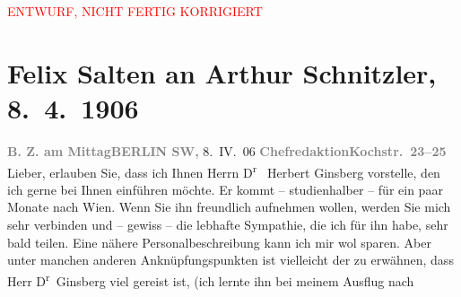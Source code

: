 
\begin{center}
            \textcolor{red}{ENTWURF, NICHT FERTIG KORRIGIERT}
                      \end{center}
            
         
         \renewcommand{\erwaehntePersonen}{Personen: Herbert Ginsberg, Ottilie Salten, Olga Schnitzler}
         \renewcommand{\erwaehnteInstitutionen}{Institutionen: B.Z. am Mittag}
         \renewcommand{\erwaehnteOrte}{Orte: Berlin, Griechenland, Kairo, Kochstraße, Wien}
         \renewcommand{\erwaehnteWerke}{}
               \section[Felix Salten an Arthur Schnitzler, 8. 4. 1906]{ Felix Salten an Arthur Schnitzler, 8. 4. 1906}\nopagebreak{}\rehead{ }\begin{ledgroupsized}[t]{13cm}\normalsize\beginnumbering \toendnotes[C]{\smallbreak\pagebreak[2]} 
\toendnotes[C]{\smallbreak}\pstart
           \noindent{}{\pb}\textcolor{gray}{\textbf{B. Z. am Mittag}}\hfill \textcolor{gray}{\textbf{BERLIN SW,}}{ }8. IV. 06\pend
           \pstart
           \textcolor{gray}{\textbf{Chefredaktion}}\hfill \textcolor{gray}{\textbf{Kochstr. 23–25}}\pend
           \pstart
           Lieber, erlauben Sie, dass ich Ihnen Herrn D\textsuperscript{r}  Herbert Ginsberg vorstelle, den
               ich gerne bei Ihnen einführen möchte. Er kommt – studienhalber – für ein paar Monate
               nach Wien. Wenn Sie ihn freundlich aufnehmen
               wollen, werden Sie mich sehr verbinden und – gewiss – die lebhafte Sympathie, die ich
               für ihn habe, sehr bald teilen. Eine nähere Personalbeschreibung kann ich mir wol
               sparen. Aber unter manchen anderen Anknüpfungspunkten ist vielleicht der zu erwähnen,
               dass Herr D\textsuperscript{r} Ginsberg viel gereist ist, (ich lernte ihn bei meinem Ausflug nach \label{K_L03417-1v}
\end{ledgroupsized}

